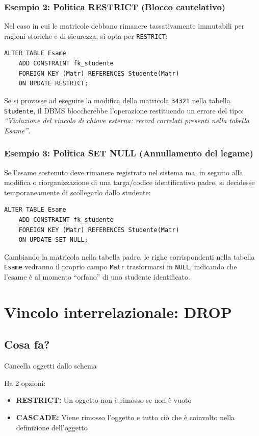 \medskip
\subsubsection{Esempio 2: Politica RESTRICT (Blocco cautelativo)}
Nel caso in cui le matricole debbano rimanere tassativamente immutabili per ragioni storiche e di sicurezza, si opta per \texttt{RESTRICT}:
\begin{lstlisting}[language=sql_generic]
ALTER TABLE Esame 
    ADD CONSTRAINT fk_studente 
    FOREIGN KEY (Matr) REFERENCES Studente(Matr)
    ON UPDATE RESTRICT;
\end{lstlisting}
Se si provasse ad eseguire la modifica della matricola \texttt{34321} nella tabella \texttt{Studente}, il DBMS bloccherebbe l'operazione restituendo un errore del tipo: \textit{``Violazione del vincolo di chiave esterna: record correlati presenti nella tabella Esame''}.

\subsubsection{Esempio 3: Politica SET NULL (Annullamento del legame)}
Se l'esame sostenuto deve rimanere registrato nel sistema ma, in seguito alla modifica o riorganizzazione di una targa/codice identificativo padre, si decidesse temporaneamente di scollegarlo dallo studente:
\begin{lstlisting}[language=sql_generic]
ALTER TABLE Esame 
    ADD CONSTRAINT fk_studente 
    FOREIGN KEY (Matr) REFERENCES Studente(Matr)
    ON UPDATE SET NULL;
\end{lstlisting}
Cambiando la matricola nella tabella padre, le righe corrispondenti nella tabella \texttt{Esame} vedranno il proprio campo \texttt{Matr} trasformarsi in \texttt{NULL}, indicando che l'esame è al momento ``orfano'' di uno studente identificato.

\section{Vincolo interrelazionale: DROP}
\subsection{Cosa fa?}
Cancella oggetti dallo schema

Ha 2 opzioni:
\begin{itemize}
    \item \textbf{RESTRICT:} Un oggetto non è rimosso se non è vuoto
    \item \textbf{CASCADE:} Viene rimosso l'oggetto e tutto ciò che è coinvolto nella definizione dell'oggetto
\end{itemize}

